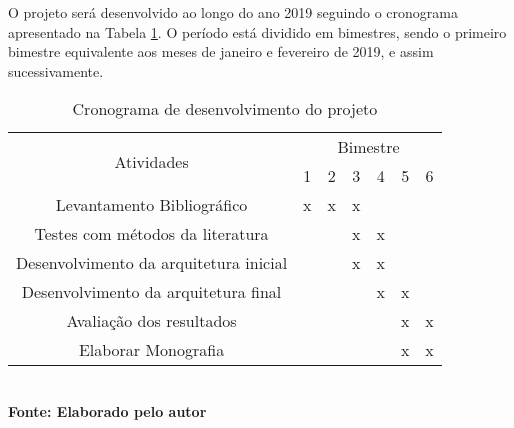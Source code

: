 O projeto será desenvolvido ao longo do ano 2019 seguindo o cronograma apresentado na Tabela \ref{tab:tabela1}. O período está dividido em bimestres, sendo o primeiro bimestre equivalente aos meses de janeiro e fevereiro de 2019, e assim sucessivamente.

\begin{table}[H]
	\centering
	\caption[Cronograma de desenvolvimento]{Cronograma de desenvolvimento do projeto}
	\label{tab:tabela1}
	\begin{tabular}{|c|c|c|c|c|c|c|}
		\hline
		\multirow{2}{*}{Atividades}            & \multicolumn{6}{c|}{Bimestre} \\ \cline{2-7} 
		& 1   & 2   & 3  & 4  & 5  & 6  \\ \hline
		Levantamento Bibliográfico             & x   & x   & x  &    &    &    \\ \hline
		Testes com métodos da literatura       &     &     & x  & x  &    &    \\ \hline
		Desenvolvimento da arquitetura inicial &     &     & x  & x  &    &    \\ \hline
		Desenvolvimento da arquitetura final   &     &     &    & x  & x  &    \\ \hline
		Avaliação dos resultados               &     &     &    &    & x  & x  \\ \hline
		Elaborar Monografia                    &     &     &    &    & x  & x  \\ \hline
	\end{tabular}
	\vspace{0.1cm} 
	{\footnotesize\\ \textbf{Fonte: Elaborado pelo autor}}
\end{table}





